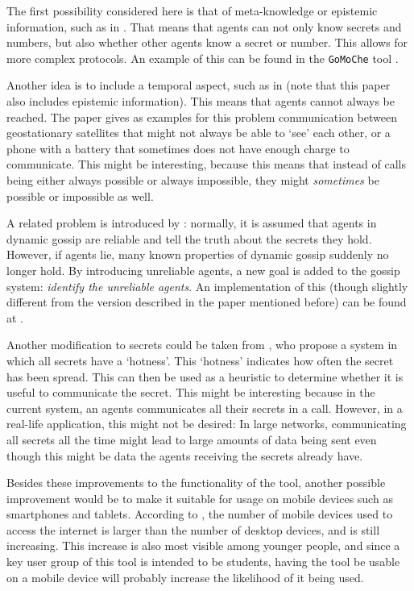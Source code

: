 The first possibility considered here is that of meta-knowledge or epistemic information, such as in \textcite{herzig_how_2017}.
That means that agents can not only know secrets and numbers, 
but also whether other agents know a secret or number.
This allows for more complex protocols.
An example of this can be found in the \texttt{GoMoChe} tool \parencite{gattinger_m4lvingomoche_2020}.

Another idea is to include a temporal aspect, such as in \textcite{slavkovik_temporal_2019}
(note that this paper also includes epistemic information).
This means that agents cannot always be reached.
The paper gives as examples for this problem communication between geostationary satellites that might not always be able to `see' each other,
or a phone with a battery that sometimes does not have enough charge to communicate.
This might be interesting, because this means that instead of calls being either always possible or always impossible, 
they might \textit{sometimes} be possible or impossible as well.

A related problem is introduced by \textcite{martins_dealing_2020}: 
normally, it is assumed that agents in dynamic gossip are reliable and tell the truth about the secrets they hold.
However, if agents lie, many known properties of dynamic gossip suddenly no longer hold.
By introducing unreliable agents, a new goal is added to the gossip system:
\textit{identify the unreliable agents}.
An implementation of this (though slightly different from the version described in the paper mentioned before) can be found at \textcite{van_den_berg_unreliable_2020}.

Another modification to secrets could be taken from \textcite{demers_epidemic_1988}, who propose a system in which all secrets have a `hotness'.
This `hotness' indicates how often the secret has been spread.
This can then be used as a heuristic to determine whether it is useful to communicate the secret.
This might be interesting because in the current system, an agents communicates all their secrets in a call.
However, in a real-life application, this might not be desired:
In large networks, communicating all secrets all the time might lead to large amounts of data being sent even though this might be data the agents receiving the secrets already have.

Besides these improvements to the functionality of the tool, 
another possible improvement would be to make it suitable for usage on mobile devices such as smartphones and tablets.
According to \textcite{cisco_cisco_2020}, the number of mobile devices used to access the internet is larger than the number of desktop devices, and is still increasing.
This increase is also most visible among younger people,
and since a key user group of this tool is intended to be students,
having the tool be usable on a mobile device will probably increase the likelihood of it being used.